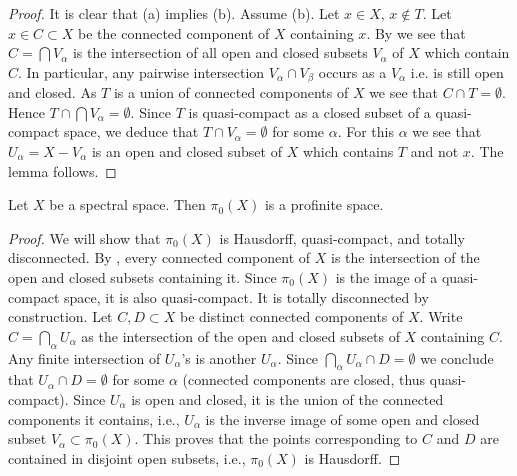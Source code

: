 \begin{proof}
  It is clear that (a) implies (b). Assume (b). Let $x \in X$, $x \notin T$. Let $x \in C \subset X$ be the connected component of $X$ containing $x$. By  we see that $C = \bigcap V_\alpha$ is the intersection of all open and closed subsets $V_\alpha$ of $X$ which contain $C$. In particular, any pairwise intersection $V_\alpha \cap V_\beta$ occurs as a $V_\alpha$ i.e. is still open and closed. As $T$ is a union of connected components of $X$ we see that $C \cap T = \emptyset$. Hence $T \cap \bigcap V_\alpha = \emptyset$. Since $T$ is quasi-compact as a closed subset of a quasi-compact space, we deduce that $T \cap V_\alpha = \emptyset$ for some $\alpha$. For this $\alpha$ we see that $U_\alpha = X - V_\alpha$ is an open and closed subset of $X$ which contains $T$ and not $x$. The lemma follows.
\end{proof}

\begin{lemma}
  \label{thm:pi0-profinite}
  Let $X$ be a spectral space. Then $\pi_0(X)$ is a profinite space.
\end{lemma}

\begin{proof}
  We will show that \(\pi_0(X)\) is Hausdorff, quasi-compact, and totally disconnected.
  By , every connected component of \(X\) is the intersection of the open and closed subsets containing it. Since \(\pi_0(X)\) is the image of a quasi-compact space, it is also quasi-compact. It is totally disconnected by construction. Let \(C,D \subset X\) be distinct connected components of \(X\). Write \(C = \bigcap_{\alpha} U_\alpha\) as the intersection of the open and closed subsets of \(X\) containing \(C\). Any finite intersection of \(U_\alpha\)'s is another \(U_\alpha\). Since \(\bigcap_\alpha U_\alpha \cap D = \emptyset\) we conclude that \(U_\alpha \cap D = \emptyset\) for some \(\alpha\) (connected components are closed, thus quasi-compact). Since \(U_\alpha\) is open and closed, it is the union of the connected components it contains, i.e., \(U_\alpha\) is the inverse image of some open and closed subset \(V_\alpha \subset \pi_0(X)\). This proves that the points corresponding to \(C\) and \(D\) are contained in disjoint open subsets, i.e., \(\pi_0(X)\) is Hausdorff.
\end{proof}

